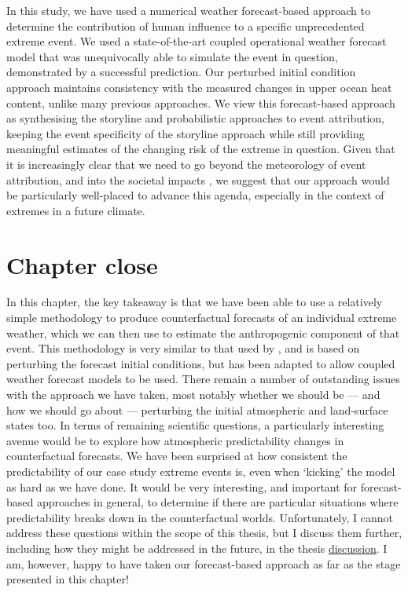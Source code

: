     In this study, we have used a numerical weather forecast-based approach to determine the contribution of human influence to a specific unprecedented extreme event. We used a state-of-the-art coupled operational weather forecast model that was unequivocally able to simulate the event in question, demonstrated by a successful prediction. Our perturbed initial condition approach maintains consistency with the measured changes in upper ocean heat content, unlike many previous approaches. We view this forecast-based approach as synthesising the storyline and probabilistic approaches to event attribution, keeping the event specificity of the storyline approach while still providing meaningful estimates of the changing risk of the extreme in question. Given that it is increasingly clear that we need to go beyond the meteorology of event attribution, and into the societal impacts \cite{mitchell_climate_2021,mitchell_increased_2022}, we suggest that our approach would be particularly well-placed to advance this agenda, especially in the context of extremes in a future climate.

\section{Chapter close}\label{ch4:close}

  In this chapter, the key takeaway is that we have been able to use a relatively simple methodology to produce counterfactual forecasts of an individual extreme weather, which we can then use to estimate the anthropogenic component of that event. This methodology is very similar to that used by \citet{pall_anthropogenic_2011}, and is based on perturbing the forecast initial conditions, but has been adapted to allow coupled weather forecast models to be used. There remain a number of outstanding issues with the approach we have taken, most notably whether we should be --- and how we should go about --- perturbing the initial atmospheric and land-surface states too. In terms of remaining scientific questions, a particularly interesting avenue would be to explore how atmospheric predictability changes in counterfactual forecasts. We have been surprised at how consistent the predictability of our case study extreme events is, even when `kicking' the model as hard as we have done. It would be very interesting, and important for forecast-based approaches in general, to determine if there are particular situations where predictability breaks down in the counterfactual worlds. Unfortunately, I cannot address these questions within the scope of this thesis, but I discuss them further, including how they might be addressed in the future, in the thesis \hyperref[discussion]{discussion}. I am, however, happy to have taken our forecast-based approach as far as the stage presented in this chapter!

